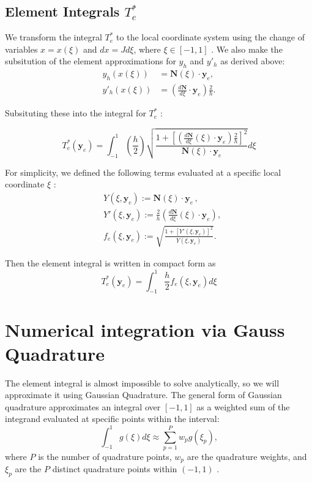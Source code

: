 \documentclass[12pt]{article}
\begin{document}
\subsection{Element Integrals \( T^{*} _e \) }

We transform the integral \( T_e^* \) to the local coordinate system using the change of variables \( x = x(\xi) \) and \( dx = J d\xi \), where \( \xi \in [-1, 1] \) . We also make the subsitution of the element approximations for \( y_h \) and \( y'_h \) as derived above:
\begin{align*}
    y_h(x(\xi)) &= \mathbf{N}(\xi) \cdot \mathbf{y}_e, \\
    y'_h(x(\xi)) &= \left( \frac{d\mathbf{N}}{d\xi} \cdot \mathbf{y}_e \right) \frac{2}{h}.
\end{align*}

Subsituting these into the integral for \( T^{*} _e \) : 
 
\[ 
    T_e^*(\mathbf{y}_e) = \int_{-1}^{1}\left(\frac{h}{2}\right) \sqrt{\frac{1 + \left[ \left( \frac{d\mathbf{N}}{d\xi}(\xi) \cdot \mathbf{y}_e \right) \frac{2}{h} \right]^2}{\mathbf{N}(\xi) \cdot \mathbf{y}_e}}  d\xi
\]

For simplicity, we defined the following terms evaluated at a specific local coordinate \( \xi \) :  
\begin{align*}
    &Y(\xi, \mathbf{y}_e) := \mathbf{N}(\xi) \cdot \mathbf{y}_e \, , \\ 
    &Y'(\xi, \mathbf{y}_e) := \frac{2}{h} \left( \frac{d\mathbf{N}}{d\xi}(\xi) \cdot \mathbf{y}_e \right) , \\ 
    &f_e(\xi, \mathbf{y}_e) := \sqrt{\frac{1 + [Y'(\xi, \mathbf{y}_e)]^2}{Y(\xi, \mathbf{y}_e)}}.
\end{align*}

Then the element integral is written in compact form as  
\[ 
    T_e^*(\mathbf{y}_e) = \int_{-1}^{1}  \frac{h}{2} f_e(\xi, \mathbf{y}_e) d\xi 
\]

\section{Numerical integration via Gauss Quadrature}
The element integral is almost impossible to solve analytically, so we will approximate it using Gaussian Quadrature. The general form of Gaussian quadrature approximates an integral over \( \left[-1,1\right] \) as a weighted sum of the integrand evaluated at specific points within the interval:  
\[ 
    \int_{-1}^{1} g(\xi) d\xi \approx \sum_{p=1}^{P} w_p g(\xi_p) ,
\]
where \(P\) is the number of quadrature points, \(w_p\) are the quadrature weights, and \(\xi_p\) are the \( P \) distinct quadrature points within \( \left(-1,1\right) \) . 
\end{document}
